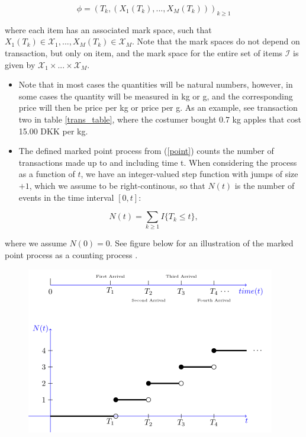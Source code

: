 \documentclass[
  11pt,
]{article}
\providecommand{\tightlist}{%
  \setlength{\itemsep}{0pt}\setlength{\parskip}{0pt}}
\begin{document}
\begin{equation}
\label{point}
\phi = (T_k, (X_1(T_k),...,X_M(T_k)))_{k\geq1}
\end{equation}

where each item has an associated mark space, such that
\(X_1(T_k) \in \mathcal{X}_1,...,X_M(T_k) \in \mathcal{X}_M\). Note that
the mark spaces do not depend on transaction, but only on item, and the
mark space for the entire set of items \(\mathcal{I}\) is given by
\(\mathcal{X}_1 \times...\times \mathcal{X}_M\).

\begin{itemize}
\tightlist
\item
  Note that in most cases the quantities will be natural numbers,
  however, in some cases the quantity will be measured in kg or g, and
  the corresponding price will then be price per kg or price per g. As
  an example, see transaction two in table \ref{trans_table}, where the
  costumer bought 0.7 kg apples that cost 15.00 DKK per kg.
\item
  The defined marked point process from (\ref{point}) counts the number
  of transactions made up to and including time t. When considering the
  process as a function of \(t\), we have an integer-valued step
  function with jumps of size \(+1\), which we assume to be
  right-continous, so that \(N(t)\) is the number of events in the time
  interval \([0,t]\):
\end{itemize}

\begin{equation}
\label{count}
N(t)=\sum_{k\geq 1} I \{T_{k} \leq t\},
\end{equation}

where we assume \(N(0)=0\). See figure below for an illustration of the
marked point process as a counting process \cite{pis}.

\begin{center}
\begin{figure}
\label{point_process}
\includegraphics[]{point_process}
\end{figure}
\end{center}
\end{document}

